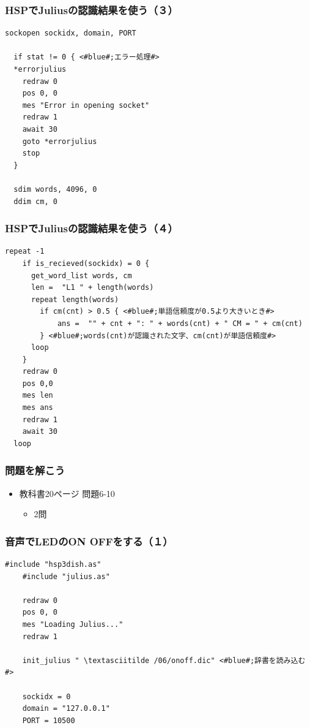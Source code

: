 \documentclass[14pt]{beamer}
\begin{document}
\begin{frame}[fragile]
  \frametitle{HSPでJuliusの認識結果を使う（３）}
  \begin{lstlisting}[caption=julius.hsp,label=julius.hsp]
  sockopen sockidx, domain, PORT

  if stat != 0 { <#blue#;エラー処理#>
  *errorjulius
    redraw 0
    pos 0, 0
    mes "Error in opening socket"
    redraw 1
    await 30
    goto *errorjulius
    stop
  }

  sdim words, 4096, 0
  ddim cm, 0
  \end{lstlisting}
\end{frame}

\begin{frame}[fragile]
  \frametitle{HSPでJuliusの認識結果を使う（４）}
  \begin{lstlisting}[caption=julius.hsp,label=julius.hsp,basicstyle=\scriptsize]
  repeat -1
    if is_recieved(sockidx) = 0 {
      get_word_list words, cm
      len =  "L1 " + length(words)
      repeat length(words)
        if cm(cnt) > 0.5 { <#blue#;単語信頼度が0.5より大きいとき#>
            ans =  "" + cnt + ": " + words(cnt) + " CM = " + cm(cnt)
        } <#blue#;words(cnt)が認識された文字、cm(cnt)が単語信頼度#>
      loop
    }
    redraw 0
    pos 0,0
    mes len
    mes ans
    redraw 1
    await 30
  loop
  \end{lstlisting}
\end{frame}

\begin{frame}
  \frametitle{問題を解こう}
  \begin{itemize}
    \item 教科書20ページ 問題6-10
    \begin{itemize}
      \item 2問
    \end{itemize}
  \end{itemize}
\end{frame}

\begin{frame}[fragile]
  \frametitle{音声でLEDのON OFFをする（１）}
  \begin{lstlisting}[caption=ledvoice.hsp,label=ledvoice.hsp]
    #include "hsp3dish.as"
    #include "julius.as"

    redraw 0
    pos 0, 0
    mes "Loading Julius..."
    redraw 1

    init_julius " \textasciitilde /06/onoff.dic" <#blue#;辞書を読み込む#>

    sockidx = 0
    domain = "127.0.0.1"
    PORT = 10500
  \end{lstlisting}
\end{frame}
\end{document}

